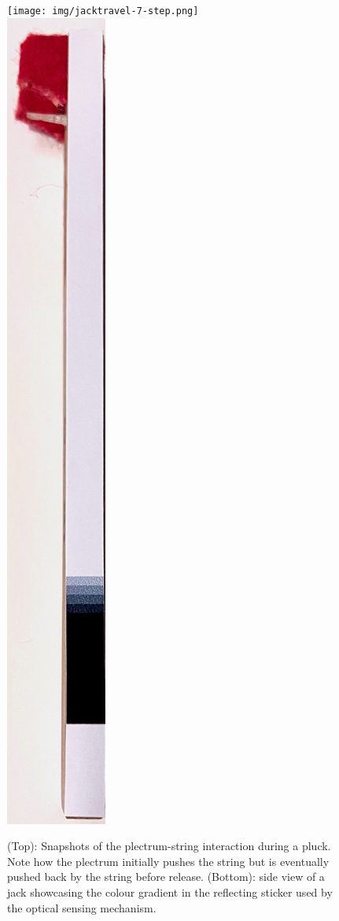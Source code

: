 \begin{figure}
\centering
\texttt{[image: img/jacktravel-7-step.png]}\\
\includegraphics[width=1\linewidth]{img/jack-w-tag.jpeg}
\caption{(Top): Snapshots of the plectrum-string interaction during a pluck. Note how the plectrum initially pushes the string but is eventually pushed back by the string before release. (Bottom): side view of a jack showcasing the colour gradient in the reflecting sticker used by the optical sensing mechanism.}\label{fig:frames}
\end{figure}

